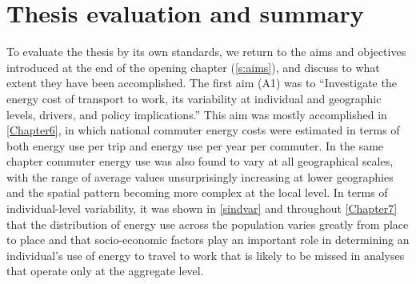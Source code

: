 \section{Thesis evaluation and summary} \label{ssummary}
To evaluate the thesis by its own standards, we return to the aims and
objectives introduced at the end of the opening chapter (\cref{s:aims}), and
discuss to what extent they have been accomplished.  The first aim (A1) was to
``Investigate the energy cost of transport to work, its variability
at individual and geographic levels, drivers, and policy implications.'' This
aim was mostly accomplished in \cref{Chapter6}, in which national commuter
energy costs were estimated in terms of both energy use per trip and energy use
per year per commuter. In the same chapter commuter energy use was also found
to vary at all geographical scales, with the range of average values
unsurprisingly increasing at lower geographies and the spatial pattern becoming
more complex at the local level. In terms of individual-level variability, it
was shown in \cref{sindvar} and throughout \cref{Chapter7} that the distribution
of energy use across the population varies greatly from place to place and that
socio-economic factors play an important role in determining an individual's
use of energy to travel to work that is likely to be missed in analyses that
operate only at the aggregate level. 

